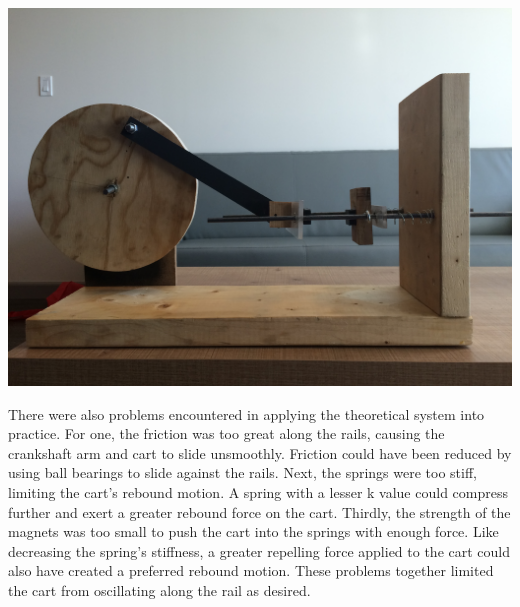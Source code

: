 \documentclass[notitlepage,10pt]{report}
\newenvironment{Figure}
  {\par\medskip\noindent\minipage{\linewidth}}
  {\endminipage\par\medskip}
\begin{document}
\begin{multicols}{2}
\begin{Figure}
   \includegraphics[width=\linewidth]{prototype}
   \label{fig:constructedPrototype}
\end{Figure}
There were also problems encountered in applying the theoretical system into practice. For one, the friction was too great along the rails, causing the crankshaft arm and cart to slide unsmoothly. Friction could have been reduced by using ball bearings to slide against the rails. Next, the springs were too stiff, limiting the cart’s rebound motion. A spring with a lesser k value could compress further and exert a greater rebound force on the cart. Thirdly, the strength of the magnets was too small to push the cart into the springs with enough force. Like decreasing the spring’s stiffness, a greater repelling force applied to the cart could also have created a preferred rebound motion. These problems together limited the cart from oscillating along the rail as desired.


\end{multicols}
\end{document}
